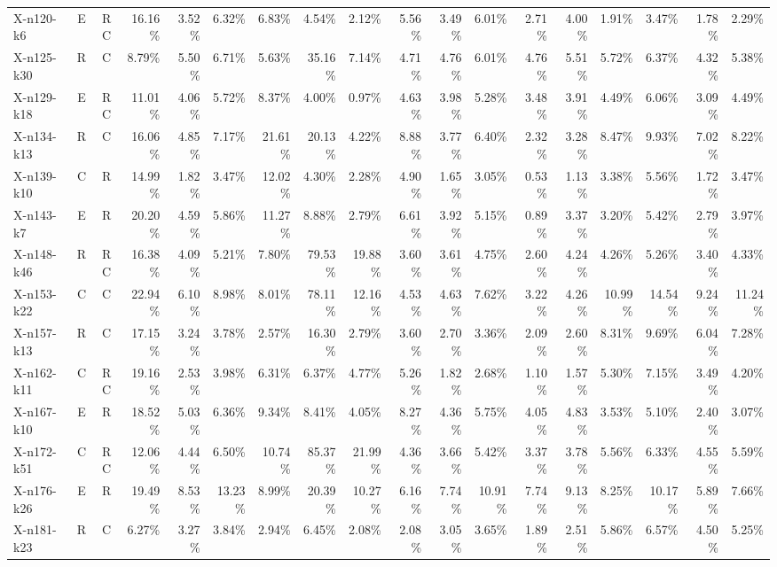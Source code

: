 \documentclass[letterpaper]{article} %
\begin{document}
\begin{landscape}
\begin{longtable}{@{}l c c r rr rrrr rr rr rr rr@{}}
X-n120-k6 & E & RC & 16.16\% & 3.52\% & 6.32\% & 6.83\% & 4.54\% & 2.12\% & 5.56\% & 3.49\% & 6.01\% & 2.71\% & 4.00\% & 1.91\% & 3.47\% & 1.78\% & 2.29\% \\
X-n125-k30 & R & C & 8.79\% & 5.50\% & 6.71\% & 5.63\% & 35.16\% & 7.14\% & 4.71\% & 4.76\% & 6.01\% & 4.76\% & 5.51\% & 5.72\% & 6.37\% & 4.32\% & 5.38\% \\
X-n129-k18 & E & RC & 11.01\% & 4.06\% & 5.72\% & 8.37\% & 4.00\% & 0.97\% & 4.63\% & 3.98\% & 5.28\% & 3.48\% & 3.91\% & 4.49\% & 6.06\% & 3.09\% & 4.49\% \\
X-n134-k13 & R & C & 16.06\% & 4.85\% & 7.17\% & 21.61\% & 20.13\% & 4.22\% & 8.88\% & 3.77\% & 6.40\% & 2.32\% & 3.28\% & 8.47\% & 9.93\% & 7.02\% & 8.22\% \\
X-n139-k10 & C & R & 14.99\% & 1.82\% & 3.47\% & 12.02\% & 4.30\% & 2.28\% & 4.90\% & 1.65\% & 3.05\% & 0.53\% & 1.13\% & 3.38\% & 5.56\% & 1.72\% & 3.47\% \\
X-n143-k7 & E & R & 20.20\% & 4.59\% & 5.86\% & 11.27\% & 8.88\% & 2.79\% & 6.61\% & 3.92\% & 5.15\% & 0.89\% & 3.37\% & 3.20\% & 5.42\% & 2.79\% & 3.97\% \\
X-n148-k46 & R & RC & 16.38\% & 4.09\% & 5.21\% & 7.80\% & 79.53\% & 19.88\% & 3.60\% & 3.61\% & 4.75\% & 2.60\% & 4.24\% & 4.26\% & 5.26\% & 3.40\% & 4.33\% \\
X-n153-k22 & C & C & 22.94\% & 6.10\% & 8.98\% & 8.01\% & 78.11\% & 12.16\% & 4.53\% & 4.63\% & 7.62\% & 3.22\% & 4.26\% & 10.99\% & 14.54\% & 9.24\% & 11.24\% \\
X-n157-k13 & R & C & 17.15\% & 3.24\% & 3.78\% & 2.57\% & 16.30\% & 2.79\% & 3.60\% & 2.70\% & 3.36\% & 2.09\% & 2.60\% & 8.31\% & 9.69\% & 6.04\% & 7.28\% \\
X-n162-k11 & C & RC & 19.16\% & 2.53\% & 3.98\% & 6.31\% & 6.37\% & 4.77\% & 5.26\% & 1.82\% & 2.68\% & 1.10\% & 1.57\% & 5.30\% & 7.15\% & 3.49\% & 4.20\% \\
X-n167-k10 & E & R & 18.52\% & 5.03\% & 6.36\% & 9.34\% & 8.41\% & 4.05\% & 8.27\% & 4.36\% & 5.75\% & 4.05\% & 4.83\% & 3.53\% & 5.10\% & 2.40\% & 3.07\% \\
X-n172-k51 & C & RC & 12.06\% & 4.44\% & 6.50\% & 10.74\% & 85.37\% & 21.99\% & 4.36\% & 3.66\% & 5.42\% & 3.37\% & 3.78\% & 5.56\% & 6.33\% & 4.55\% & 5.59\% \\
X-n176-k26 & E & R & 19.49\% & 8.53\% & 13.23\% & 8.99\% & 20.39\% & 10.27\% & 6.16\% & 7.74\% & 10.91\% & 7.74\% & 9.13\% & 8.25\% & 10.17\% & 5.89\% & 7.66\% \\
X-n181-k23 & R & C & 6.27\% & 3.27\% & 3.84\% & 2.94\% & 6.45\% & 2.08\% & 2.08\% & 3.05\% & 3.65\% & 1.89\% & 2.51\% & 5.86\% & 6.57\% & 4.50\% & 5.25\% \\

\end{longtable}
\end{landscape}
\end{document}

